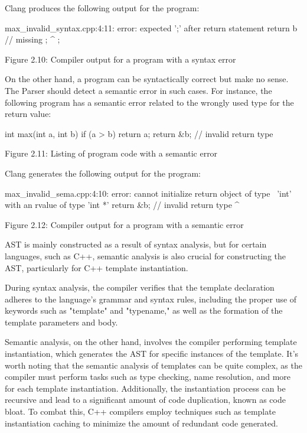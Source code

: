 Clang produces the following output for the program:

\begin{shell}
max_invalid_syntax.cpp:4:11: error: expected ';' after return statement
  return b // missing ;
          ^
          ;
\end{shell}

\begin{center}
Figure 2.10: Compiler output for a program with a syntax error
\end{center}

On the other hand, a program can be syntactically correct but make no sense. The Parser should detect a semantic error in such cases. For instance, the following program has a semantic error related to the wrongly used type for the return value:

\begin{cpp}
int max(int a, int b) {
  if (a > b)
    return a;
  return &b; // invalid return type
}
\end{cpp}

\begin{center}
Figure 2.11: Listing of program code with a semantic error
\end{center}

Clang generates the following output for the program:

\begin{shell}
max_invalid_sema.cpp:4:10: error: cannot initialize return object of type \
'int' with an rvalue of type 'int *'
  return &b; // invalid return type
         ^~
\end{shell}

\begin{center}
Figure 2.12: Compiler output for a program with a semantic error
\end{center}

AST is mainly constructed as a result of syntax analysis, but for certain languages, such as C++, semantic analysis is also crucial for constructing the AST, particularly for C++ template instantiation.

During syntax analysis, the compiler verifies that the template declaration adheres to the language's grammar and syntax rules, including the proper use of keywords such as "template" and "typename," as well as the formation of the template parameters and body.

Semantic analysis, on the other hand, involves the compiler performing template instantiation, which generates the AST for specific instances of the template. It's worth noting that the semantic analysis of templates can be quite complex, as the compiler must perform tasks such as type checking, name resolution, and more for each template instantiation. Additionally, the instantiation process can be recursive and lead to a significant amount of code duplication, known as code bloat. To combat this, C++ compilers employ techniques such as template instantiation caching to minimize the amount of redundant code generated.

